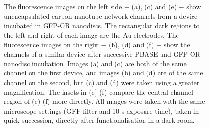 \documentclass[
  a4paper,
]{scrbook}
\begin{document}
\begin{figure}
\begin{minipage}[t]{0.03\linewidth}
{{}

}

\end{minipage}%
%
\begin{minipage}[t]{0.01\linewidth}

{\centering 

~

}

\end{minipage}%
%
\begin{minipage}[t]{0.45\linewidth}

{\centering 


}

\end{minipage}%
%
\begin{minipage}[t]{0.01\linewidth}

{\centering 

~

}

\end{minipage}%

\caption{\label{fig-PBASE-GFP-ORs}The fluorescence images on the left
side \(-\) (a), (c) and (e) \(-\) show unencapsulated carbon nanotube
network channels from a device incubated in GFP-OR nanodiscs. The
rectangular dark regions to the left and right of each image are the Au
electrodes. The fluorescence images on the right \(-\) (b), (d) and (f)
\(-\) show the channels of a similar device after successive PBASE and
GFP-OR nanodisc incubation. Images (a) and (c) are both of the same
channel on the first device, and images (b) and (d) are of the same
channel on the second, but (c) and (d) were taken using a greater
magnification. The insets in (c)-(f) compare the central channel region
of (c)-(f) more directly. All images were taken with the same microscope
settings (GFP filter and 10 s exposure time), taken in quick succession,
directly after functionalisation in a dark room.}

\end{figure}
\end{document}
